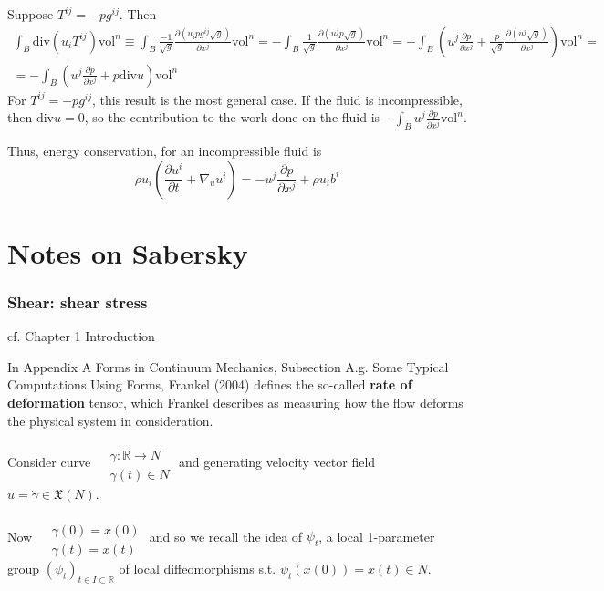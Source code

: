 \documentclass[twoside,landscape,10pt]{amsart}
\theoremstyle{plain}
\theoremstyle{definition}
\theoremstyle{remark}
\theoremstyle{remark}
\begin{document}
\begin{multicols*}{2}
Suppose $T^{ij} = -p g^{ij}$.  Then
\[
\begin{gathered}
  \int_B \text{div}(u_i T^{ij})\text{vol}^n \equiv \int_B \frac{-1}{\sqrt{g}} \frac{ \partial (u_i pg^{ij} \sqrt{g})}{ \partial x^j} \text{vol}^n = -\int_B \frac{1}{\sqrt{g}} \frac{ \partial (u^j p \sqrt{g})}{ \partial x^j} \text{vol}^n = -\int_B \left( u^j \frac{ \partial p}{ \partial x^j} + \frac{p}{ \sqrt{g}} \frac{ \partial (u^j \sqrt{g})}{ \partial x^j} \right) \text{vol}^n = \\
  = -\int_B \left( u^j \frac{ \partial p }{ \partial x^j } + p\text{div}u \right) \text{vol}^n
\end{gathered}
\]
For $T^{ij} = -pg^{ij}$, this result is the most general case.  If the fluid is incompressible, then $\text{div}u=0$, so the contribution to the work done on the fluid is $-\int_B u^j \frac{ \partial p }{ \partial x^j} \text{vol}^n$.  

Thus, energy conservation, for an incompressible fluid is 
\[
 \rho u_i \left( \frac{ \partial u^i }{ \partial t} + \nabla_u u^i \right) = - u^j \frac{ \partial p}{ \partial x^j }+ \rho u_i b^i
\]


\part{Notes on Sabersky}



\section{Shear: shear stress}

cf. Chapter 1 Introduction

In Appendix A Forms in Continuum Mechanics, Subsection A.g. Some Typical Computations Using Forms, Frankel (2004) \cite{TFrankel2004} defines the so-called \textbf{rate of deformation} tensor, which Frankel describes as measuring how the flow deforms the physical system in consideration.  

Consider curve $\begin{aligned} & \quad \\ 
  & \gamma : \mathbb{R} \to N \\
  & \gamma(t) \in N \end{aligned}$ and generating velocity vector field $u = \dot{\gamma} \in \mathfrak{X}(N)$.  

Now $\begin{aligned} & \quad \\
  & \gamma(0)= x(0) \\
  & \gamma(t) = x(t) \end{aligned}$ and so we recall the idea of $\psi_t$, a local 1-parameter group $(\psi_t)_{t\in I \subset \mathbb{R}}$ of local diffeomorphisms s.t. $\psi_t(x(0)) = x(t) \in N$.  


\end{multicols*}
\end{document}
